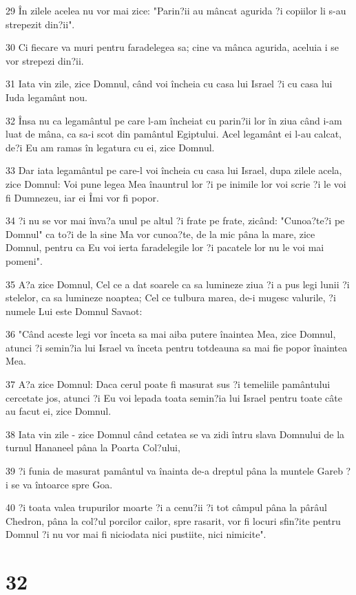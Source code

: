 \par 29 În zilele acelea nu vor mai zice: "Parin?ii au mâncat agurida ?i copiilor li s-au strepezit din?ii".
\par 30 Ci fiecare va muri pentru faradelegea sa; cine va mânca agurida, aceluia i se vor strepezi din?ii.
\par 31 Iata vin zile, zice Domnul, când voi încheia cu casa lui Israel ?i cu casa lui Iuda legamânt nou.
\par 32 Însa nu ca legamântul pe care l-am încheiat cu parin?ii lor în ziua când i-am luat de mâna, ca sa-i scot din pamântul Egiptului. Acel legamânt ei l-au calcat, de?i Eu am ramas în legatura cu ei, zice Domnul.
\par 33 Dar iata legamântul pe care-l voi încheia cu casa lui Israel, dupa zilele acela, zice Domnul: Voi pune legea Mea înauntrul lor ?i pe inimile lor voi scrie ?i le voi fi Dumnezeu, iar ei Îmi vor fi popor.
\par 34 ?i nu se vor mai înva?a unul pe altul ?i frate pe frate, zicând: "Cunoa?te?i pe Domnul" ca to?i de la sine Ma vor cunoa?te, de la mic pâna la mare, zice Domnul, pentru ca Eu voi ierta faradelegile lor ?i pacatele lor nu le voi mai pomeni".
\par 35 A?a zice Domnul, Cel ce a dat soarele ca sa lumineze ziua ?i a pus legi lunii ?i stelelor, ca sa lumineze noaptea; Cel ce tulbura marea, de-i mugesc valurile, ?i numele Lui este Domnul Savaot:
\par 36 "Când aceste legi vor înceta sa mai aiba putere înaintea Mea, zice Domnul, atunci ?i semin?ia lui Israel va înceta pentru totdeauna sa mai fie popor înaintea Mea.
\par 37 A?a zice Domnul: Daca cerul poate fi masurat sus ?i temeliile pamântului cercetate jos, atunci ?i Eu voi lepada toata semin?ia lui Israel pentru toate câte au facut ei, zice Domnul.
\par 38 Iata vin zile - zice Domnul când cetatea se va zidi întru slava Domnului de la turnul Hananeel pâna la Poarta Col?ului,
\par 39 ?i funia de masurat pamântul va înainta de-a dreptul pâna la muntele Gareb ?i se va întoarce spre Goa.
\par 40 ?i toata valea trupurilor moarte ?i a cenu?ii ?i tot câmpul pâna la pârâul Chedron, pâna la col?ul porcilor cailor, spre rasarit, vor fi locuri sfin?ite pentru Domnul ?i nu vor mai fi niciodata nici pustiite, nici nimicite".

\chapter{32}

